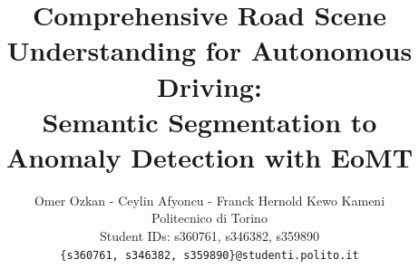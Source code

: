 \documentclass[10pt,twocolumn,letterpaper]{article}
\title{Comprehensive Road Scene Understanding for Autonomous Driving: \\ Semantic Segmentation to Anomaly Detection with EoMT}
\author{
Omer Ozkan - Ceylin Afyoncu - Franck Hernold Kewo Kameni \\
Politecnico di Torino \\
Student IDs: s360761, s346382, s359890 \\
{\tt\small \{s360761, s346382, s359890\}@studenti.polito.it}
}
\begin{document}
\maketitle
    





\FloatBarrier

{
    \small
    
    
}
\end{document}
